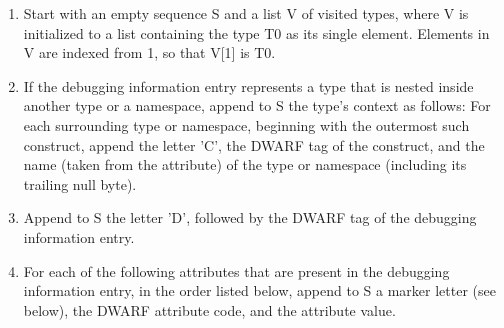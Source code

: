 \begin{enumerate}[1.]

\item Start with an empty sequence S and a list V of visited
types, where V is initialized to a list containing the type
T0 as its single element. Elements in V are indexed from 1,
so that V[1] is T0.

\item If the debugging information entry represents a type that
is nested inside another type or a namespace, append to S
the type’s context as follows: For each surrounding type
or namespace, beginning with the outermost such construct,
append the letter 'C', the DWARF tag of the construct, and
the name (taken from 
the  attribute) of the type
or namespace (including its trailing null byte).

\item  Append to S the letter 'D', followed by the DWARF tag of
the debugging information entry.

\item For each of the following attributes that are present in
the debugging information entry, in the order listed below,
append to S a marker letter (see below), the DWARF attribute
code, and the attribute value.


\end{enumerate}
